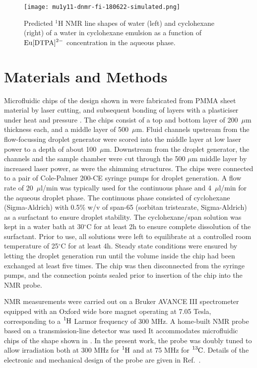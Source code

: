\begin{figure}
  \begin{center}
    \texttt{[image: mu1y11-dnmr-fi-180622-simulated.png]}
  \end{center}
  \caption{Predicted $^1$H NMR line shapes of water (left) and cyclohexane (right) of a
  water in cyclohexane emulsion as a function of $\ce{Eu[DTPA]^{2-}}$ concentration
  in the aqueous phase.
  }
  \label{fig:predicted-spectra}
\end{figure}




\section{Materials and Methods}

Microfluidic chips of the design shown in 
were fabricated from PMMA sheet material by
laser cutting, and subsequent bonding of layers with a plasticiser
under heat and pressure \citep{Yilmaz:2016fx}. The chips consist of a
top and bottom layer of 200~$\mu$m thickness each, and a middle layer of
500~$\mu$m. Fluid channels upstream from the flow-focussing droplet
generator were scored into the middle layer at low laser power to a depth
of about 100~$\mu$m. Downstream from the droplet generator, the channels and
the sample chamber were cut through the 500 $\mu$m middle layer by increased
laser power, as were the shimming structures. The chips were connected to
a pair of Cole-Palmer 200-CE syringe pumps for droplet generation.
A flow rate of 20~$\mu$l/min was typically used for the continuous
phase and 4~$\mu$l/min for the aqueous droplet phase.
The continuous phase consisted of cyclohexane (Sigma-Aldrich)
with 0.5\% w/v of span-65 (sorbitan
tristearate, Sigma-Aldrich) as a surfactant to ensure droplet stability.
The cyclohexane/span solution was kept in a water bath at 30$^\circ$C
for at least 2h to ensure complete dissolution of the surfactant.
Prior to use, all solutions were left to equilibrate at a controlled room temperature
of 25$^\circ$C for at least 4h.
Steady state conditions were ensured by letting the droplet generation run until
the volume inside the chip had been exchanged at least five times. The
chip was then disconnected from the syringe pumps, and the connection
points sealed prior to insertion of the chip into the NMR probe.

NMR measurements were carried out on a Bruker AVANCE III
spectrometer equipped with an Oxford wide bore magnet operating at 7.05 Tesla,
corresponding to a $\ce{^1H}$ Larmor frequency of 300 MHz. A home-built NMR probe
based on a transmission-line detector was used \citep{Finch:2016gv}
It accommodates microfluidic chips of the shape shown in .
In the present work, the probe was doubly
tuned to allow irradiation both at 300 MHz for $\ce{^1H}$ and at 75 MHz for
$\ce{^{13}C}$. Details of the electronic and mechanical design of the
probe are given in Ref.~\citep{Finch:2017vb}.

